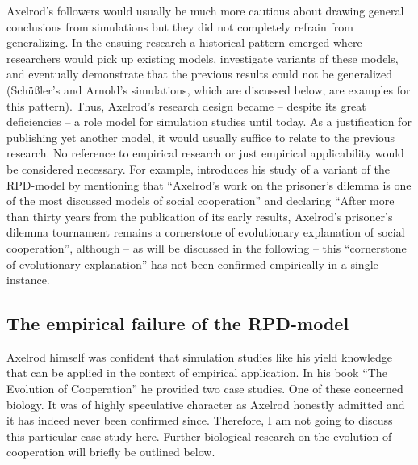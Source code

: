 \documentclass[graybox, English]{svmult}
\begin{document}
Axelrod's followers would usually be much more cautious about drawing
general conclusions from simulations but they did not completely
refrain from generalizing. In the ensuing research a historical
pattern emerged where researchers would pick up existing models,
investigate variants of these models, and eventually demonstrate that the
previous results could not be generalized (Schüßler's and Arnold's
simulations, which are discussed below, are examples for this
pattern). Thus, Axelrod's research design became – despite its great
deficiencies – a role model for simulation studies until today. As a
justification for publishing yet another model, it would usually
suffice to relate to the previous research. No reference to empirical
research or just empirical applicability would be considered
necessary. For example, \citet{rangoni:2013} introduces his study of a
variant of the RPD-model by mentioning that ``Axelrod’s work on the
prisoner’s dilemma is one of the most discussed models of social
cooperation'' and declaring ``After more than thirty years from the
publication of its early results, Axelrod’s prisoner’s dilemma
tournament remains a cornerstone of evolutionary explanation of social
cooperation'', although -- as will be discussed in the following --
this ``cornerstone of evolutionary explanation'' has not been
confirmed empirically in a single instance.

\subsection{The empirical failure of the RPD-model}

Axelrod himself was confident that simulation studies like his yield
knowledge that can be applied in the context of empirical
application. In his book ``The Evolution of Cooperation''
\citep{axelrod:1984} he provided two case studies. One of these
concerned biology. It was of highly speculative character as Axelrod
honestly admitted and it has indeed never been confirmed
since. Therefore, I am not going to discuss this particular case
study here. Further biological research on the evolution of
cooperation will briefly be outlined below.
\end{document}
